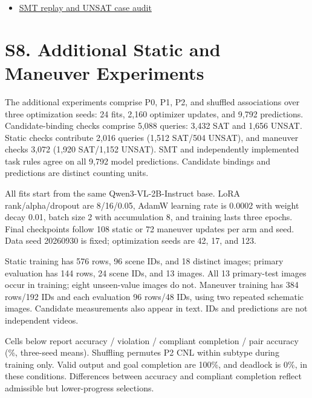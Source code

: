 \documentclass[11pt,a4paper]{article}
\begin{document}
\begin{itemize}\setlength{\itemsep}{0pt}\setlength{\parsep}{0pt}\setlength{\topsep}{2pt}
\item \href{\detokenize{../experiments-section-2026-09-30-002/unsat_review.json}}{SMT replay and UNSAT case audit}
\end{itemize}


\endgroup
\section*{S8. Additional Static and Maneuver Experiments}

The additional experiments comprise P0, P1, P2, and shuffled associations over three optimization seeds: 24 fits, 2,160 optimizer updates, and 9,792 predictions. Candidate-binding checks comprise 5,088 queries: 3,432 SAT and 1,656 UNSAT. Static checks contribute 2,016 queries (1,512 SAT/504 UNSAT), and maneuver checks 3,072 (1,920 SAT/1,152 UNSAT). SMT and independently implemented task rules agree on all 9,792 model predictions. Candidate bindings and predictions are distinct counting units.\par

All fits start from the same Qwen3-VL-2B-Instruct base. LoRA rank/alpha/dropout are 8/16/0.05, AdamW learning rate is 0.0002 with weight decay 0.01, batch size 2 with accumulation 8, and training lasts three epochs. Final checkpoints follow 108 static or 72 maneuver updates per arm and seed. Data seed 20260930 is fixed; optimization seeds are 42, 17, and 123.\par

Static training has 576 rows, 96 scene IDs, and 18 distinct images; primary evaluation has 144 rows, 24 scene IDs, and 13 images. All 13 primary-test images occur in training; eight unseen-value images do not. Maneuver training has 384 rows/192 IDs and each evaluation 96 rows/48 IDs, using two repeated schematic images. Candidate measurements also appear in text. IDs and predictions are not independent videos.\par

Cells below report accuracy / violation / compliant completion / pair accuracy (\%, three-seed means). Shuffling permutes P2 CNL within subtype during training only. Valid output and goal completion are 100\%, and deadlock is 0\%, in these conditions. Differences between accuracy and compliant completion reflect admissible but lower-progress selections.\par
\end{document}
